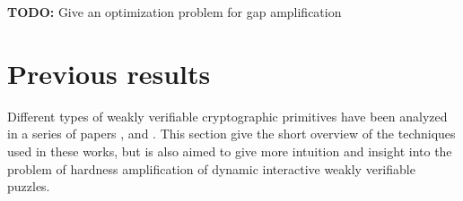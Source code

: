 \documentclass[11pt,a4paper,titlepage]{memoir}
\begin{document}
\begin{todo}
  \textbf{TODO:} Give an optimization problem for gap amplification
\end{todo}


\section{Previous results}
Different types of weakly verifiable cryptographic primitives have been analyzed in a series of papers \cite{canetti2004hardness},
\cite{Dodis:2009:SAI:1530441.1530450} and \cite{DBLP:journals/corr/abs-1002-3534}.
This section give the short overview of the techniques used in these works, but is also aimed to give more intuition and insight into
the problem of hardness amplification of dynamic interactive weakly verifiable puzzles.
\label{st:previous_results}
\end{document}
